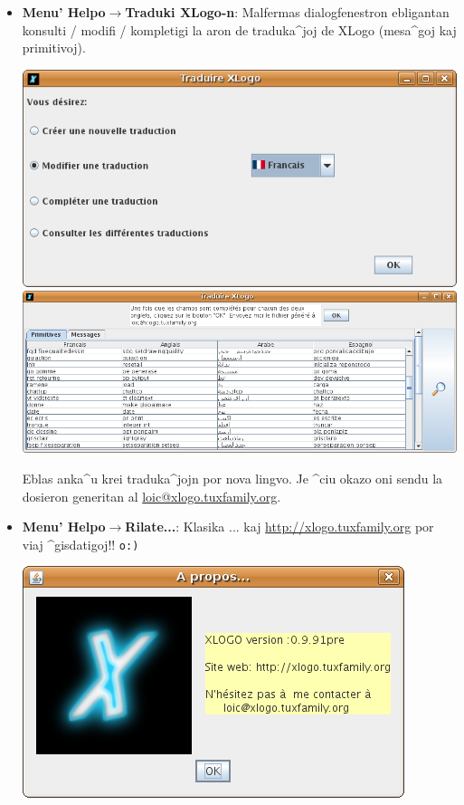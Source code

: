 \begin{itemize}
\item \textbf{Menu' Helpo$\to$Traduki XLogo-n}: Malfermas
  dialogfenestron ebligantan konsulti / modifi / kompletigi la aron de
  traduka^joj de XLogo (mesa^goj kaj primitivoj).
  \begin{center}
    \includegraphics[scale=0.4]{bildoj/CaptureXLogoTrad1.png}
    \includegraphics[scale=0.4]{bildoj/CaptureXLogoTrad2.png}
  \end{center}
  \vspace{0.25cm} Eblas anka^u krei traduka^jojn por nova
  lingvo.  Je ^ciu okazo oni sendu la dosieron generitan al
  \url{loic@xlogo.tuxfamily.org}.
\item \textbf{Menu' Helpo$\to$Rilate...}: Klasika ... kaj
  \url{http://xlogo.tuxfamily.org} por viaj ^gisdatigoj!!
  \texttt{o:)}
  \begin{center}
    \includegraphics[scale=0.6]{bildoj/CaptureApropos.png}
  \end{center}
  \vspace{0.25cm}
\end{itemize}



